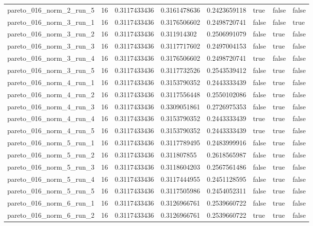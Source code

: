 \begin{tabular}{@{}llllllll@{}}
pareto\_016\_norm\_2\_run\_5 & 16 & 0.3117433436 & 0.3161478636 & 0.2423659118 & true & false & false \\
pareto\_016\_norm\_3\_run\_1 & 16 & 0.3117433436 & 0.3176506602 & 0.2498720741 & false & false & true \\
pareto\_016\_norm\_3\_run\_2 & 16 & 0.3117433436 & 0.311914302 & 0.2506991079 & false & true & false \\
pareto\_016\_norm\_3\_run\_3 & 16 & 0.3117433436 & 0.3117717602 & 0.2497004153 & false & true & false \\
pareto\_016\_norm\_3\_run\_4 & 16 & 0.3117433436 & 0.3176506602 & 0.2498720741 & true & false & false \\
pareto\_016\_norm\_3\_run\_5 & 16 & 0.3117433436 & 0.3117732526 & 0.2543539412 & false & true & false \\
pareto\_016\_norm\_4\_run\_1 & 16 & 0.3117433436 & 0.3153790352 & 0.2443333439 & false & true & false \\
pareto\_016\_norm\_4\_run\_2 & 16 & 0.3117433436 & 0.3117556448 & 0.2550102086 & false & true & false \\
pareto\_016\_norm\_4\_run\_3 & 16 & 0.3117433436 & 0.3309051861 & 0.2726975353 & false & true & false \\
pareto\_016\_norm\_4\_run\_4 & 16 & 0.3117433436 & 0.3153790352 & 0.2443333439 & true & true & false \\
pareto\_016\_norm\_4\_run\_5 & 16 & 0.3117433436 & 0.3153790352 & 0.2443333439 & true & true & false \\
pareto\_016\_norm\_5\_run\_1 & 16 & 0.3117433436 & 0.3117789495 & 0.2483999916 & false & true & false \\
pareto\_016\_norm\_5\_run\_2 & 16 & 0.3117433436 & 0.311807855 & 0.2618565987 & false & true & false \\
pareto\_016\_norm\_5\_run\_3 & 16 & 0.3117433436 & 0.3118604203 & 0.2567561486 & false & true & false \\
pareto\_016\_norm\_5\_run\_4 & 16 & 0.3117433436 & 0.3117444955 & 0.2451128595 & false & true & false \\
pareto\_016\_norm\_5\_run\_5 & 16 & 0.3117433436 & 0.3117505986 & 0.2454052311 & false & true & false \\
pareto\_016\_norm\_6\_run\_1 & 16 & 0.3117433436 & 0.3126966761 & 0.2539660722 & false & true & false \\
pareto\_016\_norm\_6\_run\_2 & 16 & 0.3117433436 & 0.3126966761 & 0.2539660722 & true & true & false \\

\end{tabular}
